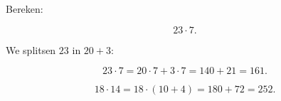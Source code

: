 \documentclass{ximera}
\begin{document}


\begin{voorbeeld}

Bereken:

\[
23\cdot7.
\]

We splitsen \(23\) in \(20+3\):

\[
23\cdot7
=
20\cdot7+3\cdot7
=
140+21
=
161.
\]

\end{voorbeeld}


\begin{voorbeeld}

\[
18\cdot14
=
18\cdot(10+4)
=
180+72
=
252.
\]

\end{voorbeeld}
\end{document}

